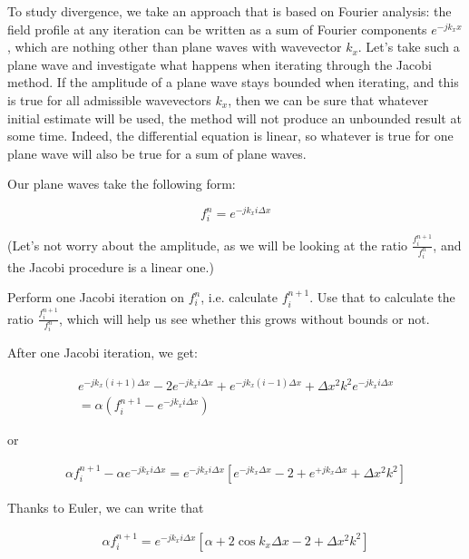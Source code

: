To study divergence, we take an approach that is based on Fourier analysis: the field profile at any iteration can be written as a sum of Fourier components $e^{-j k_x x}$, which are nothing other than plane waves with wavevector $k_x$. Let's take such a plane wave and investigate what happens when iterating through the Jacobi method. If the amplitude of a plane wave stays bounded when iterating, and this is true for all admissible wavevectors $k_x$, then we can be sure that whatever initial estimate will be used, the method will not produce an unbounded result at some time. Indeed, the differential equation is linear, so whatever is true for one plane wave will also be true for a sum of plane waves.

Our plane waves take the following form:

\begin{equation}
f_i^n = e^{-j k_x i \Delta x}
\end{equation} 

(Let's not worry about the amplitude, as we will be looking at the ratio $\frac{f_i^{n+1}}{f_i^{n}}$, and the Jacobi procedure is a linear one.)

\begin{cue}
Perform one Jacobi iteration on $f_i^n$, i.e. calculate $f_i^{n+1}$. Use that to calculate the ratio $\frac{f_i^{n+1}}{f_i^{n}}$, which will help us see whether this grows without bounds or not.  
\end{cue}

After one Jacobi iteration, we get:

\begin{align}
 e^{-j k_x (i+1) \Delta x} -2 e^{-j k_x i \Delta x} + 
  e^{-j k_x (i-1) \Delta x} + \Delta x^2 k^2  e^{-j k_x i \Delta x} \\ \nonumber
 = \alpha\left(f_i^{n+1} - e^{-j k_x i \Delta x} \right)
\end{align} 

or

\begin{align}
\alpha f_i^{n+1} -  \alpha e^{-j k_x i \Delta x} = e^{-j k_x i \Delta x}  \left[ e^{-j k_x \Delta x} -2 + e^{+j k_x \Delta x} + \Delta x^2 k^2 \right]
\end{align} 

Thanks to Euler, we can write that

\begin{align}
  \alpha f_i^{n+1}  =  e^{-j k_x i \Delta x}  \left[ \alpha +2 \cos {k_x \Delta x} -2 + \Delta x^2 k^2 \right]
\end{align} 

